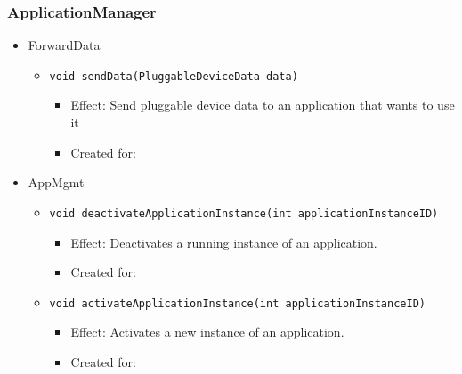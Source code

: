     \subsubsection{ApplicationManager}
        \begin{itemize}
            \item ForwardData
            \begin{itemize}
                \item \texttt{void sendData(PluggableDeviceData data)}
                \begin{itemize}
                    \item Effect: Send pluggable device data to an application that wants to use it
                    \item Created for:
                \end{itemize}
            \end{itemize}

            \item AppMgmt
            \begin{itemize}
                \item \texttt{void deactivateApplicationInstance(int applicationInstanceID)}
                \begin{itemize}
                    \item Effect: Deactivates a running instance of an application.
                    \item Created for:
                \end{itemize}
                \item \texttt{void activateApplicationInstance(int applicationInstanceID)}
                \begin{itemize}
                    \item Effect: Activates a new instance of an application.
                    \item Created for:
                \end{itemize}
            \end{itemize}
        \end{itemize}

